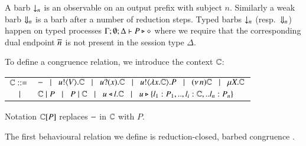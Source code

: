 \smallskip 

\noi A barb $\downarrow_{n}$ is an observable on an output prefix with subject $n$.
Similarly a weak barb $\Downarrow_{n}$ is a barb after a number of reduction steps.
Typed barbs $\downarrow_{n}$ (resp.\ $\Downarrow_{n}$)
happen on typed processes $\Gamma; \emptyset; \Delta \vdash P \triangleright \diamond$
where we require that the corresponding dual endpoint $\overline{n}$ is not present
in the session type $\Delta$.

To define a congruence relation, we introduce the context ${\Bbb C}$:\\  

\noi 
{\small
\begin{tabular}{rl}
	${\Bbb C}::=$\!\!\!\! & $- \;\;\;|\;\;\; u ! \langle V \rangle . {\Bbb C} \;\;\;|\;\;\; u ? (x) . {\Bbb C}
\;\;\;|\;\;\; u ! \langle \lambda x.{\Bbb C} \rangle . P
\;\;\;|\;\;\; (\nu\, n) {\Bbb C} \;\;\;|\;\;\; \mu X. {\Bbb C}$\\ 
             $\;\;\;|\;\;\;$\!\!\!\!& ${\Bbb C} \;|\; P \;\;\;|\;\;\; P \;|\; {\Bbb C} 
\;\;\;|\;\;\; u \triangleleft l . {\Bbb C} \;\;\;|\;\;\; u \triangleright \{l_1:P_1,..,l_i:{\Bbb C},..l_n:P_n\}$\\
	\end{tabular}
}
\smallskip 

\noi Notation ${\Bbb C}[P]$ replaces $-$ in ${\Bbb C}$ with $P$.

\smallskip 

\noi The first behavioural relation we define is reduction-closed, barbed congruence \cite{HondaKYoshida95}. 

\smallskip 

